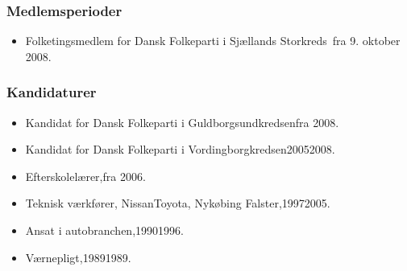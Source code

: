 \documentclass[11pt, a4paper]{awesome-cv}
\begin{document}
\begin{cvletter}
\subsubsection*{Medlemsperioder}
\begin{itemize}
\item Folketingsmedlem for Dansk Folkeparti i Sjællands Storkreds fra 9. oktober 2008.
\end{itemize}
\subsubsection*{Kandidaturer}
\begin{itemize}
\item Kandidat for Dansk Folkeparti i Guldborgsundkredsenfra 2008.
\item Kandidat for Dansk Folkeparti i Vordingborgkredsen20052008.
\end{itemize}
\begin{itemize}
\item Efterskolelærer,fra 2006.
\item Teknisk værkfører, NissanToyota, Nykøbing Falster,19972005.
\item Ansat i autobranchen,19901996.
\item Værnepligt,19891989.
\end{itemize}
\end{cvletter}
\end{document}
